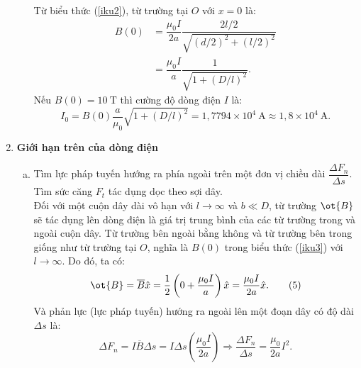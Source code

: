 \begin{loigiai}
\begin{enumerate}[1)]
\begin{enumerate}[a)]
\begin{center}
\end{center}

Từ biểu thức (\ref{iku2}), từ trường tại $O$ với $x=0$ là:
\begin{align*}
    B(0)&=\dfrac{\mu_0 I}{2a} \dfrac{2l/2}{\sqrt{(d/2)^2+(l/2)^2}}\\
    &=\dfrac{\mu_0 I}{a} \dfrac{1}{\sqrt{1+(D/l)^2}}. \tag{3} \label{iku3}
\end{align*}
 Nếu $B(0) = 10~\mathrm{T}$ thì cường độ dòng điện $I$ là:
\[ I_0=B(0) \dfrac{a}{\mu_0} \sqrt{1+(D/l)^2} =1,7794 \times 10^4 ~\mathrm{A} \approx 1,8\times 10^4 ~\mathrm{A}. \tag{4}\]
    \end{enumerate}
    \item \textbf{Giới hạn trên của dòng điện}
    \begin{enumerate}[a)]
        \item Tìm lực pháp tuyến hướng ra phía ngoài trên một đơn vị chiều dài $\dfrac{\Delta F_n}{\Delta s}$. Tìm sức căng $F_t$ tác dụng dọc theo sợi dây.\\
        Đối với một cuộn dây dài vô hạn với $l \to \infty$ và $b \ll D$, từ trường $\ot{B}$ sẽ tác dụng lên dòng điện là giá trị trung bình của các từ trường trong và ngoài cuộn dây. Từ trường bên ngoài bằng không và từ trường bên trong giống như từ trường tại $O$, nghĩa là $B(0)$ trong biểu thức (\ref{iku3}) với $l \to \infty$. Do đó, ta có:
        \[ \ot{B}= \overline{B} \hat{x} =\dfrac{1}{2} \left(0+\dfrac{\mu_0 I}{a} \right) \hat{x}= \dfrac{\mu_0 I}{2a} \hat{x}. \tag{5} \]
        Và phản lực (lực pháp tuyến) hướng ra ngoài lên một đoạn dây có độ dài $\Delta s$ là:
        \[ \Delta F_n =I \overline{B}\Delta s = I\Delta s \left(\dfrac{\mu_0 I}{2a} \right) \Rightarrow \dfrac{\Delta F_n}{\Delta s} = \dfrac{\mu_0 }{2a} I^2. \tag{6}\]
        \begin{center}


\end{center}
\end{enumerate}
\end{enumerate}
\end{loigiai}
